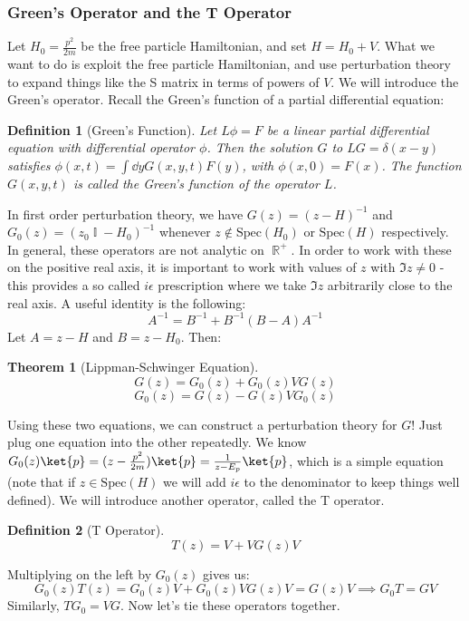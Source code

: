 \documentclass{article}
\DeclareMathOperator{\RR}{\mathbb{R}}
\DeclareMathOperator{\II}{\mathbb{I}}
\newtheorem{defn}{Definition}
\newtheorem{thm}{Theorem}
\begin{document}
\subsubsection{Green's Operator and the T Operator}
Let $H_0 = \frac{p^2}{2m}$ be the free particle Hamiltonian, and set $H = H_0 + V$. What we want to do is exploit the free particle Hamiltonian, and use perturbation theory to expand things like the S matrix in terms of powers of $V$. We will introduce the Green's operator. Recall the Green's function of a partial differential equation:
\begin{defn}[Green's Function] Let $L\phi=F$ be a linear partial differential equation with differential operator $\phi$. Then the solution $G$ to $LG=\delta(x-y)$ satisfies $\phi(x,t) = \int \dd y G(x,y,t) F(y)$, with $\phi(x,0)=F(x)$. The function $G(x,y,t)$ is called the Green's function of the operator $L$.
\end{defn}
In first order perturbation theory, we have $G(z) = (z-H)^{-1}$ and $G_0(z) = (z_0\II - H_0)^{-1}$ whenever $z \not\in \textrm{Spec}(H_0)$ or $\textrm{Spec}(H)$ respectively. In general, these operators are not analytic on $\RR^+$. In order to work with these on the positive real axis, it is important to work with values of $z$ with $\Im z \neq 0$ - this provides a so called $i \epsilon$ prescription where we take $\Im z$ arbitrarily close to the real axis. A useful identity is the following:
\begin{equation}A^{-1} = B^{-1} + B^{-1}(B-A)A^{-1}\end{equation}
Let $A = z-H$ and $B = z-H_0$. Then:
\begin{thm}[Lippman-Schwinger Equation]
\[G(z)=G_0(z)+G_0(z)VG(z)\]
\[G_0(z)=G(z)-G(z)VG_0(z)\]\end{thm}
Using these two equations, we can construct a perturbation theory for $G$! Just plug one equation into the other repeatedly. We know $G_0(z)\ket{p} = (z-\frac{p^2}{2m})\ket{p} = \frac{1}{z-E_p}\ket{p}$, which is a simple equation (note that if $z \in \textrm{Spec}(H)$ we will add $i\epsilon$ to the denominator to keep things well defined). We will introduce another operator, called the T operator.
\begin{defn}[T Operator]
\begin{equation}
T(z) = V+VG(z)V
\end{equation}
\end{defn}
Multiplying on the left by $G_0(z)$ gives us:
\[G_0(z)T(z) = G_0(z)V+G_0(z)VG(z)V = G(z)V \implies G_0 T = GV\]
Similarly, $TG_0 = VG$. Now let's tie these operators together.
\end{document}
